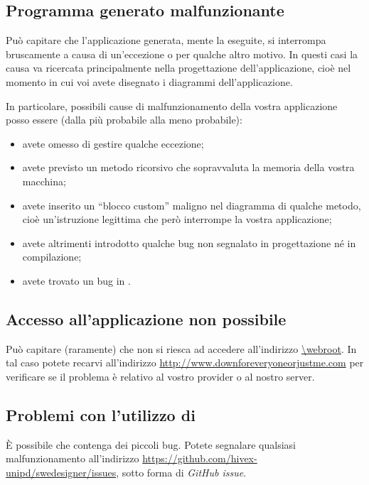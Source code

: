 \subsection{Programma generato malfunzionante} \label{sec:mal_gen}

Può capitare che l'applicazione generata, mente la eseguite, si interrompa bruscamente a causa di un'eccezione o per qualche altro motivo. In questi casi la causa va ricercata principalmente nella progettazione dell'applicazione, cioè nel momento in cui voi avete disegnato i diagrammi dell'applicazione.

In particolare, possibili cause di malfunzionamento della vostra applicazione posso essere (dalla più probabile alla meno probabile):
\begin{itemize}
	\item avete omesso di gestire qualche eccezione;
	\item avete previsto un metodo ricorsivo che sopravvaluta la memoria della vostra macchina;
	\item avete inserito un “blocco custom” maligno nel diagramma di qualche metodo, cioè un'istruzione legittima che però interrompe la vostra applicazione;
	\item avete altrimenti introdotto qualche bug non segnalato in progettazione né in compilazione;
	\item avete trovato un bug in \proj.
\end{itemize}



\subsection{Accesso all'applicazione non possibile}

Può capitare (raramente) che non si riesca ad accedere all'indirizzo \url{\webroot}. In tal caso potete recarvi all'indirizzo \url{http://www.downforeveryoneorjustme.com} per verificare se il problema è relativo al vostro provider o al nostro server.



\subsection{Problemi con l'utilizzo di \proj}

È possibile che \proj{} contenga dei piccoli bug. Potete segnalare qualsiasi malfunzionamento all'indirizzo \url{https://github.com/hivex-unipd/swedesigner/issues}, sotto forma di \emph{GitHub issue}.





